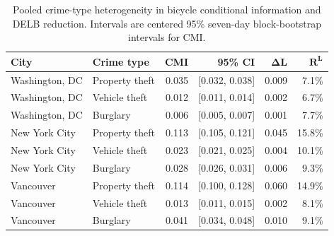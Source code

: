 
\begin{table}[H]
\caption{Pooled crime-type heterogeneity in bicycle conditional information and DELB reduction. Intervals are centered 95\% seven-day block-bootstrap intervals for CMI.}
\label{tab:crime_type_heterogeneity}
\centering
\begin{tabular*}{\linewidth}{@{\extracolsep{\fill}}llrrrr@{}}
\toprule
\textbf{City} & \textbf{Crime type} & \textbf{CMI} &
\textbf{95\% CI} & \(\boldsymbol{\Delta L}\) & \(\boldsymbol{R^L}\)\\
\midrule
Washington, DC & Property theft & 0.035 & [0.032, 0.038] & 0.009 & 7.1\%\\
Washington, DC & Vehicle theft & 0.012 & [0.011, 0.014] & 0.002 & 6.7\%\\
Washington, DC & Burglary & 0.006 & [0.005, 0.007] & 0.001 & 7.7\%\\
New York City & Property theft & 0.113 & [0.105, 0.121] & 0.045 & 15.8\%\\
New York City & Vehicle theft & 0.023 & [0.021, 0.025] & 0.004 & 10.1\%\\
New York City & Burglary & 0.028 & [0.026, 0.031] & 0.006 & 9.3\%\\
Vancouver & Property theft & 0.114 & [0.100, 0.128] & 0.060 & 14.9\%\\
Vancouver & Vehicle theft & 0.013 & [0.011, 0.015] & 0.002 & 8.1\%\\
Vancouver & Burglary & 0.041 & [0.034, 0.048] & 0.010 & 9.1\%\\
\bottomrule
\end{tabular*}
\end{table}
